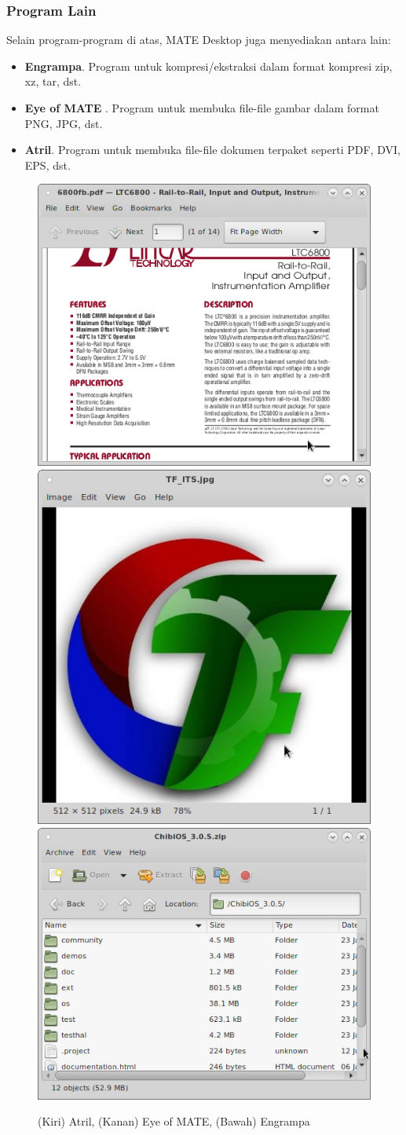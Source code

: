 \documentclass[12pt,]{article}
\begin{document}
	\subsubsection{Program Lain}
	Selain program-program di atas, MATE Desktop juga menyediakan antara lain:
	\begin{itemize}
		\item \textbf{Engrampa}. Program untuk kompresi/ekstraksi dalam format kompresi zip, xz, tar, dst.
		\item \textbf{Eye of MATE} . Program untuk membuka file-file gambar dalam format PNG, JPG, dst.
		\item \textbf{Atril}. Program untuk membuka file-file dokumen terpaket seperti PDF, DVI, EPS, dst.
	\end{itemize}

	\begin{figure}[H]
		\centering
		\includegraphics[width=0.45\linewidth]{images/mateapp/atril}
		\includegraphics[width=0.45\linewidth]{images/mateapp/eom}
		\includegraphics[width=0.45\linewidth]{images/mateapp/engrampa}
		\caption{(Kiri) Atril, (Kanan) Eye of MATE, (Bawah) Engrampa}
	\end{figure}
\end{document}
